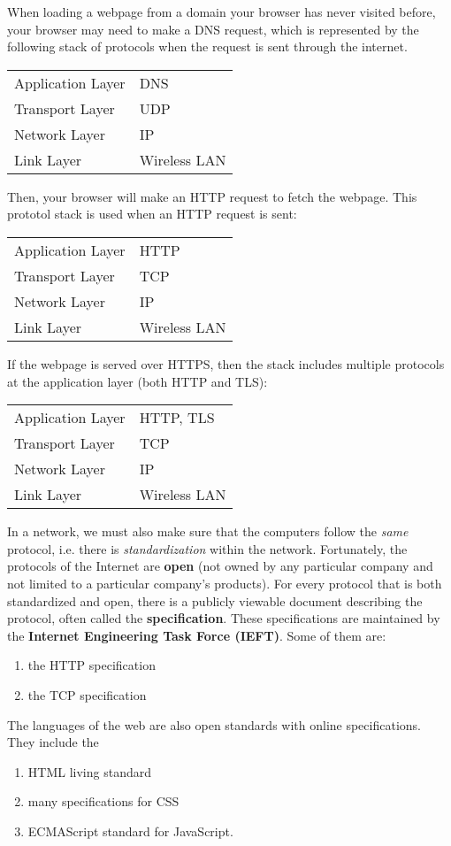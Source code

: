 \documentclass[a4paper, 12pt]{report}
\theoremstyle{remark}
\theoremstyle{definition}
\begin{document}
\begin{example}
When loading a webpage from a domain your browser has never visited before, your browser may need to make a DNS request, which is represented by the following stack of protocols when the request is sent through the internet. 
\begin{center}
\begin{tabular}{l|l}
    Application Layer & DNS\\
    Transport Layer & UDP \\
    Network Layer & IP \\
    Link Layer & Wireless LAN
\end{tabular}
\end{center}
Then, your browser will make an HTTP request to fetch the webpage. This prototol stack is used when an HTTP request is sent:
\begin{center}
\begin{tabular}{l|l}
    Application Layer & HTTP\\
    Transport Layer & TCP \\
    Network Layer & IP \\
    Link Layer & Wireless LAN
\end{tabular}
\end{center}
If the webpage is served over HTTPS, then the stack includes multiple protocols at the application layer (both HTTP and TLS): 
\begin{center}
\begin{tabular}{l|l}
    Application Layer & HTTP, TLS\\
    Transport Layer & TCP \\
    Network Layer & IP \\
    Link Layer & Wireless LAN
\end{tabular}
\end{center}
\end{example}

In a network, we must also make sure that the computers follow the \textit{same} protocol, i.e. there is \textit{standardization} within the network. Fortunately, the protocols of the Internet are \textbf{open} (not owned by any particular company and not limited to a particular company's products). For every protocol that is both standardized and open, there is a publicly viewable document describing the protocol, often called the \textbf{specification}. These specifications are maintained by the \textbf{Internet Engineering Task Force (IEFT)}. Some of them are: 
\begin{enumerate}
    \item the HTTP specification
    \item the TCP specification
\end{enumerate}
The languages of the web are also open standards with online specifications. They include the
\begin{enumerate}
    \item HTML living standard
    \item many specifications for CSS
    \item ECMAScript standard for JavaScript. 
\end{enumerate}
\end{document}
